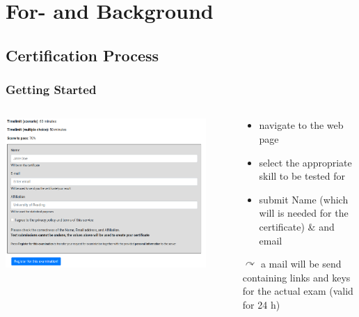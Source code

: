 \section[For- and Background]{For- and Background}



\subsection{Certification Process}

\begin{frame}
  \frametitle{Getting Started}
  \begin{columns}
    \begin{column}{.5\textwidth}
       \centering
      \includegraphics[width=0.9\textwidth]{images/getting_started}
    \end{column}
    \begin{column}{.5\textwidth}
      \begin{itemize}[<+->]
       \item navigate to the web page
       \item select the appropriate skill to be tested for
       \item submit Name (which will is needed for the certificate) \& and email
      \end{itemize}
      \pause
      $\curvearrowright$ a mail will be send containing links and keys for the actual exam (valid for 24 h)
    \end{column}
  \end{columns}
  
\end{frame}

